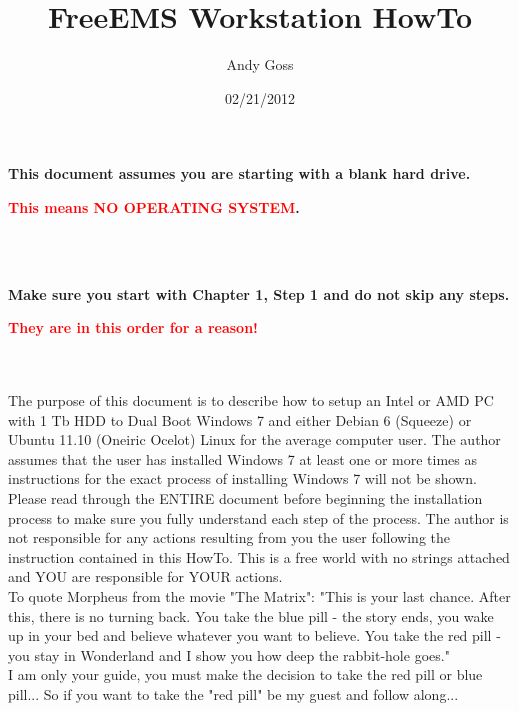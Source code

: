 \documentclass[12pt,notitlepage,onecolumn,oneside,openany,draft]{memoir}
\title{\textsf{FreeEMS Workstation HowTo}}
\author{\textsf{Andy Goss}}
\date{\textsf{02/21/2012}}
\begin{document}
\maketitle

\centerline{\textbf{\textsf{This document assumes you are starting with a blank hard drive.}}} \newline
\centerline{\textbf{\textsf{\textcolor{red}{This means NO OPERATING SYSTEM}.}}} \newline
\\
\textcolor{white}{x}
\\
\centerline{\textbf{\textsf{Make sure you start with Chapter 1, Step 1 and do not skip any steps.}}} \newline
\centerline{\textbf{\textsf{\textcolor{red}{They are in this order for a reason!}}}} \newline
\\
\textcolor{white}{x}
\\
\textsf{The purpose of this document is to describe how to setup an Intel or AMD PC with 1 Tb HDD to Dual Boot Windows 7 and either Debian 6 (Squeeze) or Ubuntu 11.10 (Oneiric Ocelot) Linux for the average computer user.  The author assumes that the user has installed Windows 7 at least one or more times as instructions for the exact process of installing Windows 7 will not be shown.} \newline
\\
\textsf{Please read through the ENTIRE document before beginning the installation process to make sure you fully understand each step of the process.  The author is not responsible for any actions resulting from you the user following the instruction contained in this HowTo. This is a free world with no strings attached and YOU are responsible for YOUR actions.} \newline
\\
\textsf{To quote Morpheus from the movie "The Matrix": "This is your last chance. After this, there is no turning back. You take the blue pill - the story ends, you wake up in your bed and believe whatever you want to believe. You take the red pill - you stay in Wonderland and I show you how deep the rabbit-hole goes."} \newline
\\
\textsf{I am only your guide, you must make the decision to take the red pill or blue pill...  So if you want to take the "red pill" be my guest and follow along...} \newline
\end{document}
